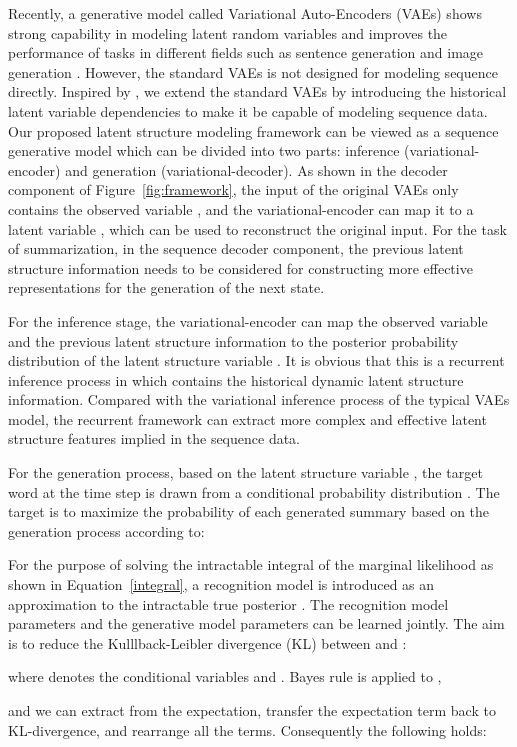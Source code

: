 \documentclass[11pt,letterpaper]{article}
\begin{document}
Recently, a generative model called Variational Auto-Encoders (VAEs) \cite{kingma2013auto,rezende2014stochastic} shows strong capability in modeling latent random variables and improves the performance of tasks in different fields such as sentence generation \cite{bowman2016generating} and image generation \cite{gregor2015draw}.
However, the standard VAEs is not designed for modeling sequence directly.
Inspired by \cite{chung2015recurrent}, we extend the standard VAEs by introducing the historical latent variable dependencies to make it be capable of modeling sequence data.  
Our proposed latent structure modeling framework can be viewed as a sequence generative model which can be divided into two parts: inference (variational-encoder) and generation (variational-decoder). 
As shown in the decoder component of Figure~\ref{fig:framework}, the input of the original VAEs only contains the observed variable , and the variational-encoder can map it to a latent variable  , which can be used to reconstruct the original input.
For the task of summarization, in the sequence decoder component, the previous latent structure information needs to be considered for constructing more effective representations for the generation of the next state.

For the inference stage, the variational-encoder can map the observed variable  and the previous latent structure information   to the posterior probability distribution of the latent structure variable .
It is obvious that this is a recurrent inference process in which  contains the historical dynamic latent structure information.
Compared with the variational inference process  of the typical VAEs model,
the recurrent framework can extract more complex and effective latent structure features implied in the sequence data.   

For the generation process, based on the latent structure variable , the target word  at the time step  is drawn from a conditional probability distribution .
The target is to maximize the probability of each generated summary  based on the generation process according to:

For the purpose of solving the intractable integral of the marginal likelihood as shown in Equation~\ref{integral}, a recognition model  is introduced as an approximation to the intractable true posterior .
The recognition model parameters  and the generative model parameters  can be learned jointly. The aim is to reduce the Kulllback-Leibler divergence (KL) between  and :

where  denotes the conditional variables  and .
Bayes rule is applied to ,
\begin{comment}

\end{comment}
and we can extract  from the expectation, transfer the expectation term  back to KL-divergence, and rearrange all the terms.
Consequently the following holds:  
\end{document}
